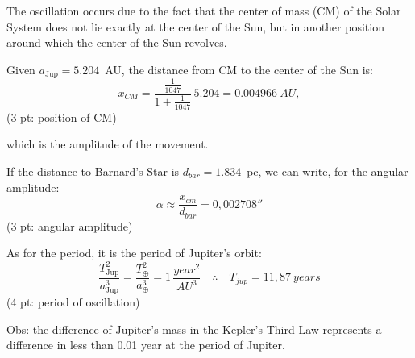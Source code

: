The oscillation occurs due to the fact that the center of mass (CM) of the
Solar System does not lie
exactly at the center of the Sun, but in another position around which the
center of the Sun revolves.

Given $a_{\mathrm{Jup}} = 5.204$~AU, the distance from CM to the center of the Sun
is:
\[ x_{CM} = \frac{\frac{1}{1047}}{1+\frac{1}{1047}}\,5.204 = 0.004966\ AU, \]
\hfill(3 pt: position of CM)

which is the amplitude of the movement.

If the distance to Barnard's Star is $d_{bar} = 1.834$~pc, we can write, for
the angular amplitude:
\[ \alpha \approx \frac{x_{cm}}{d_{bar}} = 0{,}002708'' \]
\hfill(3 pt: angular amplitude)

As for the period, it is the period of Jupiter's orbit:
\[ \frac{T_{\mathrm{Jup}}^2}{a_{\mathrm{Jup}}^3} = \frac{T_\oplus^2}{a_\oplus^3}
   = 1\,\frac{year^2}{AU^3}
   \quad\therefore\quad T_{jup} = 11{,}87\ years \]
\hfill(4 pt: period of oscillation)

Obs: the difference of Jupiter's mass in the Kepler's Third Law represents a
difference in less than 0.01 year at the period of Jupiter.
